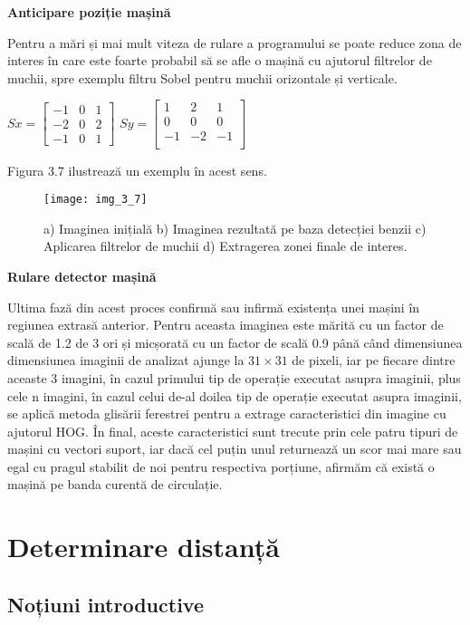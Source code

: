 \textbf{Anticipare poziție mașină}

Pentru a mări și mai mult viteza de rulare a programului se poate reduce zona de interes în care este foarte probabil să se afle o mașină cu ajutorul filtrelor de muchii, spre exemplu filtru Sobel pentru muchii orizontale și verticale.
\begin{center}
	$ Sx = 
	\begin{bmatrix}
	-1 & 0 & 1 \\
	-2 & 0 & 2 \\
	-1 & 0 & 1
	\end{bmatrix}
	$
	$ Sy = 
	\begin{bmatrix}
	1 & 2 & 1 \\
	0 & 0 & 0 \\
	-1 & -2 & -1 \\
	\end{bmatrix}
	$
\end{center}
Figura 3.7 ilustrează un exemplu în acest sens.
\begin{figure}[!h]
	\centering
	\texttt{[image: img\_3\_7]}
	\caption[Regiune interes detecție mașină]{a) Imaginea inițială b) Imaginea rezultată pe baza detecției benzii c) Aplicarea filtrelor de muchii d) Extragerea zonei finale de interes.}
\end{figure}

\textbf{Rulare detector mașină}

Ultima fază din acest proces confirmă sau infirmă existența unei mașini în regiunea extrasă anterior. Pentru aceasta imaginea este mărită cu un factor de scală de 1.2 de 3 ori și micșorată cu un factor de scală 0.9 până când dimensiunea dimensiunea imaginii de analizat ajunge la $31 \times 31$ de pixeli, iar pe fiecare dintre aceaste 3 imagini, în cazul primului tip de operație executat asupra imaginii, plus cele n imagini, în cazul celui de-al doilea tip de operație executat asupra imaginii, se aplică metoda glisării ferestrei pentru a extrage caracteristici din imagine cu ajutorul HOG. În final, aceste caracteristici sunt trecute prin cele patru tipuri de mașini cu vectori suport, iar dacă cel puțin unul returnează un scor mai mare sau egal cu pragul stabilit de noi pentru respectiva porțiune, afirmăm că există o mașină pe banda curentă de circulație.

\section{Determinare distanță}
\subsection*{Noțiuni introductive}

